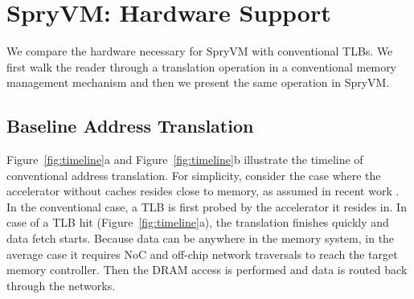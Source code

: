 


\section{SpryVM: Hardware Support}
\label{sec:associativity}

%


We compare the hardware necessary for SpryVM with conventional
TLBs. We first walk the reader through a translation operation in a
conventional memory management mechanism and then we present the same
operation in SpryVM.

\subsection{Baseline Address Translation}

Figure~\ref{fig:timeline}a and Figure~\ref{fig:timeline}b illustrate the timeline of
conventional address translation. For simplicity, consider the case 
where the accelerator without caches resides close to memory, as
assumed in recent work \cite{haria:devirtualizing, picorel:near-memory}. In the conventional case, a TLB is
first probed by the accelerator it resides in. In case of a TLB hit (Figure~\ref{fig:timeline}a), the translation finishes quickly and 
data fetch starts. Because data can be anywhere in the memory system, in the average case it requires NoC and off-chip network 
traversals to reach the target memory controller. Then the DRAM access is performed and data is routed back through the networks.

